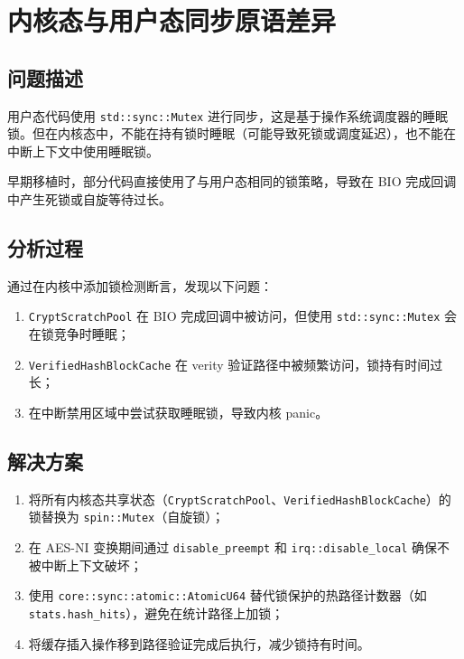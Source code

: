 \section{内核态与用户态同步原语差异}

\subsection{问题描述}

用户态代码使用 \texttt{std::sync::Mutex} 进行同步，这是基于操作系统调度器的睡眠锁。但在内核态中，不能在持有锁时睡眠（可能导致死锁或调度延迟），也不能在中断上下文中使用睡眠锁。

早期移植时，部分代码直接使用了与用户态相同的锁策略，导致在 BIO 完成回调中产生死锁或自旋等待过长。

\subsection{分析过程}

通过在内核中添加锁检测断言，发现以下问题：
\begin{enumerate}
    \item \texttt{CryptScratchPool} 在 BIO 完成回调中被访问，但使用 \texttt{std::sync::Mutex} 会在锁竞争时睡眠；
    \item \texttt{VerifiedHashBlockCache} 在 verity 验证路径中被频繁访问，锁持有时间过长；
    \item 在中断禁用区域中尝试获取睡眠锁，导致内核 panic。
\end{enumerate}

\subsection{解决方案}

\begin{enumerate}
    \item 将所有内核态共享状态（\texttt{CryptScratchPool}、\texttt{VerifiedHashBlockCache}）的锁替换为 \texttt{spin::Mutex}（自旋锁）；
    \item 在 AES-NI 变换期间通过 \texttt{disable\_preempt} 和 \texttt{irq::disable\_local} 确保不被中断上下文破坏；
    \item 使用 \texttt{core::sync::atomic::AtomicU64} 替代锁保护的热路径计数器（如 \texttt{stats.hash\_hits}），避免在统计路径上加锁；
    \item 将缓存插入操作移到路径验证完成后执行，减少锁持有时间。
\end{enumerate}

